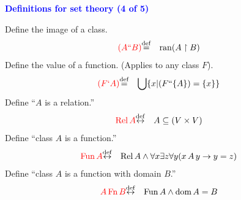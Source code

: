 \documentclass{slides}
\begin{document}
\begin{slide}

\begin{center}
\textcolor{blue}{\textbf{Definitions for set theory (4 of 5)}}
\end{center}

Define the image of a class.
\begin{eqnarray}
\textcolor{red}{( A `` B )} & {\buildrel\rm def\over =} &
 {\rm ran} ( A \restriction B ) \label{df-ima}
\end{eqnarray}
Define the value of a function.  (Applies to any class $F$).
\begin{eqnarray}
\textcolor{red}{( F ` A )} & {\buildrel\rm def\over =} &
 \bigcup \{ x | ( F `` \{ A \} ) = \{ x \} \} \label{df-fv}
\end{eqnarray}
Define ``$A$ is a relation.''
\begin{eqnarray}
\textcolor{red}{ {\rm Rel}\, A} & {\buildrel\rm def\over \leftrightarrow} &
 A \subseteq ( V \times V ) \label{df-rel}
\end{eqnarray}
Define ``class $A$ is a function.''
\begin{eqnarray}
\textcolor{red}{ {\rm Fun}\, A} & {\buildrel\rm def\over \leftrightarrow} &
 {\rm Rel}\, A \wedge \forall x \exists z
\forall y ( x \,A \,y \rightarrow y = z )  \label{dffun3}
\end{eqnarray}
Define ``class $A$ is a function with domain $B$.''
\begin{eqnarray}
\textcolor{red}{ A \,{\rm Fn}\, B} & {\buildrel\rm def\over \leftrightarrow} &
  {\rm Fun}\, A \wedge {\rm dom}\, A = B   \label{df-fn}
\end{eqnarray}

\end{slide}
\end{document}
